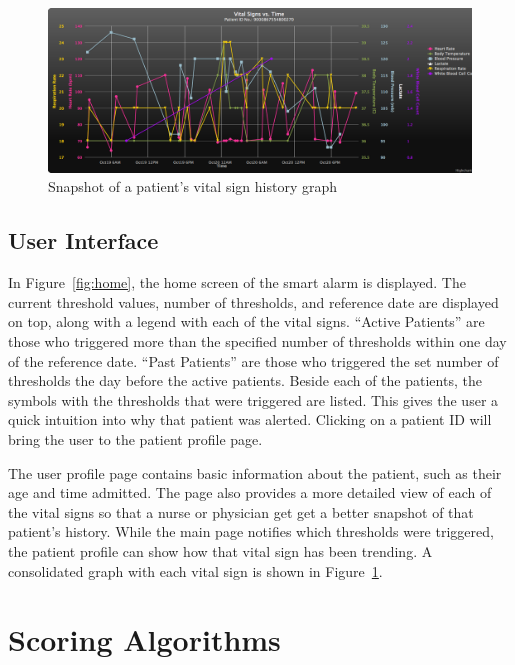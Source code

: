 \documentclass{sig-alternate}
\begin{document}
\begin{figure}
	\begin{center}
		\includegraphics[width=1.0\linewidth]{patientGraph.png}
	\end{center}
	\caption{Snapshot of a patient's vital sign history graph}
	\label{fig:patient_graph}
\end{figure}

\vspace{10pt}
\subsection{User Interface}
\label{subsec:ui}
\vspace{10pt}

In Figure~\ref{fig:home}, the home screen of the smart alarm is displayed.  The current threshold values, number of thresholds, and reference date are displayed on top, along with a legend with each of the vital signs.  ``Active Patients'' are those who triggered more than the specified number of thresholds within one day of the reference date. ``Past Patients'' are those who triggered the set number of thresholds the day before the active patients.  Beside each of the patients, the symbols with the thresholds that were triggered are listed.  This gives the user a quick intuition into why that patient was alerted.  Clicking on a patient ID will bring the user to the patient profile page.

The user profile page contains basic information about the patient, such as their age and time admitted.  The page also provides a more detailed view of each of the vital signs so that a nurse or physician get get a better snapshot of that patient's history.  While the main page notifies which thresholds were triggered, the patient profile can show how that vital sign has been trending. A consolidated graph with each vital sign is shown in Figure~\ref{fig:patient_graph}.

\vspace{10pt}
\section{Scoring Algorithms}
\vspace{10pt}
\label{sec:scoring}
\end{document}
